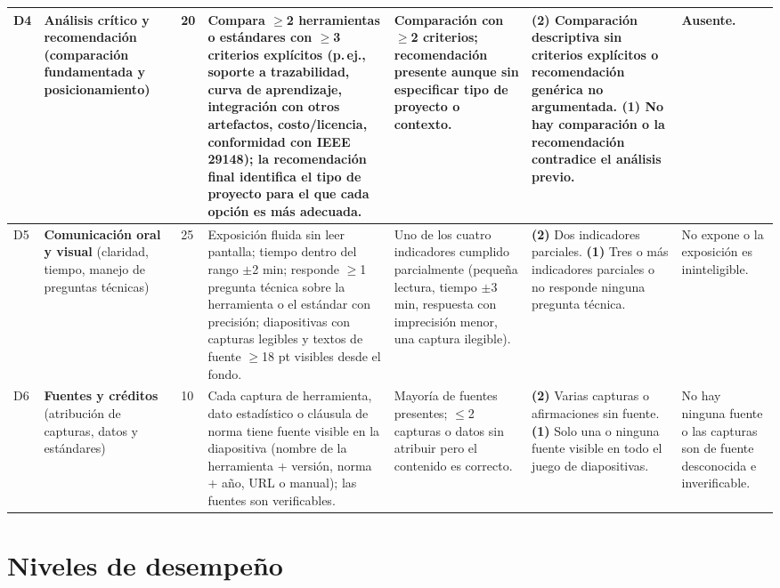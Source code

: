 \documentclass[11pt]{article}
\begin{document}
{\begin{longtable}{|C{0.45cm}|L{2.4cm}|C{0.65cm}|L{3.1cm}|L{3.1cm}|L{3.1cm}|L{2.4cm}|}
	\hline
	 D4 & \textbf{Análisis crítico y recomendación} (comparación fundamentada y posicionamiento) & 20 & Compara $\geq$2 herramientas o estándares con $\geq$3 criterios explícitos (p.\,ej., soporte a trazabilidad, curva de aprendizaje, integración con otros artefactos, costo/licencia, conformidad con IEEE 29148); la recomendación final identifica el tipo de proyecto para el que cada opción es más adecuada. & Comparación con $\geq$2 criterios; recomendación presente aunque sin especificar tipo de proyecto o contexto. & \textbf{(2)} Comparación descriptiva sin criterios explícitos o recomendación genérica no argumentada. \textbf{(1)} No hay comparación o la recomendación contradice el análisis previo. & Ausente.\\
	\hline
	D5 & \textbf{Comunicación oral y visual} (claridad, tiempo, manejo de preguntas técnicas) & 25 & Exposición fluida sin leer pantalla; tiempo dentro del rango $\pm$2 min; responde $\geq$1 pregunta técnica sobre la herramienta o el estándar con precisión; diapositivas con capturas legibles y textos de fuente $\geq$18 pt visibles desde el fondo. & Uno de los cuatro indicadores cumplido parcialmente (pequeña lectura, tiempo $\pm$3 min, respuesta con imprecisión menor, una captura ilegible). & \textbf{(2)} Dos indicadores parciales. \textbf{(1)} Tres o más indicadores parciales o no responde ninguna pregunta técnica. & No expone o la exposición es ininteligible.\\
	\hline
	 D6 & \textbf{Fuentes y créditos} (atribución de capturas, datos y estándares) & 10 & Cada captura de herramienta, dato estadístico o cláusula de norma tiene fuente visible en la diapositiva (nombre de la herramienta + versión, norma + año, URL o manual); las fuentes son verificables. & Mayoría de fuentes presentes; $\leq$2 capturas o datos sin atribuir pero el contenido es correcto. & \textbf{(2)} Varias capturas o afirmaciones sin fuente. \textbf{(1)} Solo una o ninguna fuente visible en todo el juego de diapositivas. & No hay ninguna fuente o las capturas son de fuente desconocida e inverificable.\\
	\hline
\end{longtable}
}

\section{\textcolor{utegreendk}{Niveles de desempeño}}\label{sec:niveles}
\end{document}

